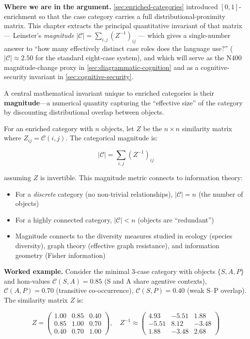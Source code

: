 \documentclass[
]{article}
\providecommand{\tightlist}{%
  \setlength{\itemsep}{0pt}\setlength{\parskip}{0pt}}
\begin{document}
\textbf{Where we are in the argument.} \autoref{sec:enriched-categories}
introduced \([0,1]\)-enrichment so that the case category carries a full
distributional-proximity matrix. This chapter extracts the principal
quantitative invariant of that matrix --- Leinster's \emph{magnitude}
\(|\mathcal{C}| = \sum_{i,j} (Z^{-1})_{ij}\) --- which gives a
single-number answer to ``how many effectively distinct case roles does
the language use?'' (\(|\mathcal{C}| \approx 2.50\) for the standard
eight-case system), and which will serve as the N400 magnitude-change
proxy in \autoref{sec:diagrammatic-cognition} and as a
cognitive-security invariant in \autoref{sec:cognitive-security}.

A central mathematical invariant unique to enriched categories is their
\textbf{magnitude}---a numerical quantity capturing the ``effective
size'' of the category by discounting distributional overlap between
objects.

For an enriched category with \(n\) objects, let \(Z\) be the
\(n \times n\) similarity matrix where \(Z_{ij} = \mathcal{C}(i, j)\).
The categorical magnitude is:

\begin{equation}
|\mathcal{C}| = \sum_{i,j} (Z^{-1})_{ij}
\label{eq:eq-5-3}
\end{equation}

assuming \(Z\) is invertible. This magnitude metric connects to
information theory:

\begin{itemize}
\tightlist
\item
  For a \emph{discrete} category (no non-trivial relationships),
  \(|\mathcal{C}| = n\) (the number of objects)
\item
  For a highly connected category, \(|\mathcal{C}| < n\) (objects are
  ``redundant'')
\item
  Magnitude connects to the diversity measures studied in ecology
  (species diversity), graph theory (effective graph resistance), and
  information geometry (Fisher information)
\end{itemize}

\textbf{Worked example.} Consider the minimal 3-case category with
objects \(\{S, A, P\}\) and hom-values \(\mathcal{C}(S,A) = 0.85\) (S
and A share agentive contexts), \(\mathcal{C}(A,P) = 0.70\) (transitive
co-occurrence), \(\mathcal{C}(S,P) = 0.40\) (weak S--P overlap). The
similarity matrix \(Z\) is:

\begin{equation}
Z = \begin{pmatrix} 1.00 & 0.85 & 0.40 \\ 0.85 & 1.00 & 0.70 \\ 0.40 & 0.70 & 1.00 \end{pmatrix}, \quad Z^{-1} \approx \begin{pmatrix} 4.93 & -5.51 & 1.88 \\ -5.51 & 8.12 & -3.48 \\ 1.88 & -3.48 & 2.68 \end{pmatrix}
\label{eq:eq-5-4}
\end{equation}
\end{document}
